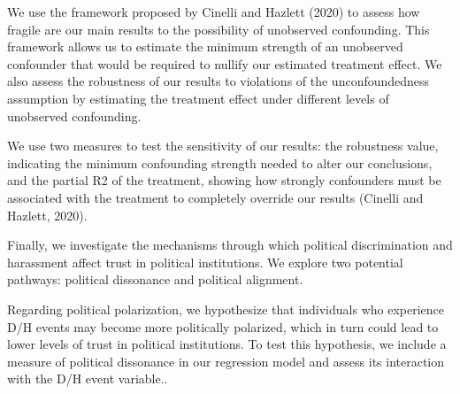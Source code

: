 \documentclass{article}
\begin{document}
We use the framework proposed by Cinelli and Hazlett (2020) to assess how fragile are our main results to the possibility of unobserved confounding. This framework allows us to estimate the minimum strength of an unobserved confounder that would be required to nullify our estimated treatment effect. We also assess the robustness of our results to violations of the unconfoundedness assumption by estimating the treatment effect under different levels of unobserved confounding.

We use two measures to test the sensitivity of our results: the robustness value, indicating the minimum confounding strength needed to alter our conclusions, and the partial R2 of the treatment, showing how strongly confounders must be associated with the treatment to completely override our results (Cinelli and Hazlett, 2020).

Finally, we investigate the mechanisms through which political discrimination and harassment affect trust in political institutions. We explore two potential pathways: political dissonance and political alignment.

Regarding political polarization, we hypothesize that individuals who experience D/H events may become more politically polarized, which in turn could lead to lower levels of trust in political institutions. To test this hypothesis, we include a measure of political dissonance in our regression model and assess its interaction with the D/H event variable..


\end{document}
